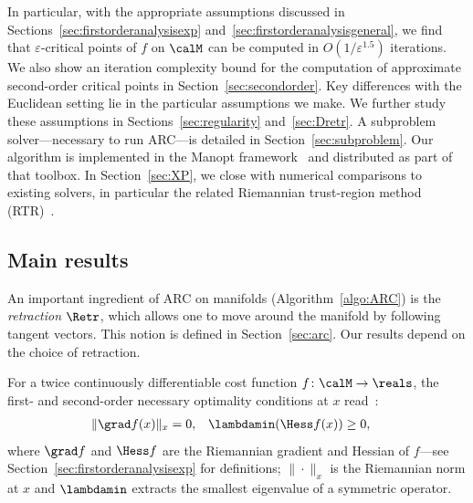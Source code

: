 In particular, with the appropriate assumptions discussed in Sections~\ref{sec:firstorderanalysisexp} and~\ref{sec:firstorderanalysisgeneral}, we find that $\varepsilon$-critical points of $f$ on $\calM$ can be computed in $O(1/\varepsilon^{1.5})$ iterations. We also show an iteration complexity bound for the computation of approximate second-order critical points in Section~\ref{sec:secondorder}. Key differences with the Euclidean setting lie in the particular assumptions we make. We further study these assumptions in Sections~\ref{sec:regularity} and~\ref{sec:Dretr}. A subproblem solver---necessary to run ARC---is detailed in Section~\ref{sec:subproblem}. Our algorithm is implemented in the Manopt framework~\citep{manopt} and distributed as part of that toolbox. In Section~\ref{sec:XP}, we close with numerical comparisons to existing solvers, in particular the related Riemannian trust-region method (RTR)~\citep{genrtr}.

\subsection*{Main results}

An important ingredient of ARC on manifolds (Algorithm~\ref{algo:ARC}) is the \emph{retraction} $\Retr$, which allows one to move around the manifold by following tangent vectors. This notion is defined in Section~\ref{sec:arc}. Our results depend on the choice of retraction.

For a twice continuously differentiable cost function $f \colon \calM \to \reals$, the first- and second-order necessary optimality conditions at $x$ read~\citep{yang2012optimality}:
\begin{align*}
	\|\grad f(x)\|_x & = 0, & & \lambdamin(\Hess f(x)) \geq 0,
\end{align*}
where $\grad f$ and $\Hess f$ are the Riemannian gradient and Hessian of $f$---see Section~\ref{sec:firstorderanalysisexp} for definitions; $\|\cdot\|_x$ is the Riemannian norm at $x$ and $\lambdamin$ extracts the smallest eigenvalue of a symmetric operator.


